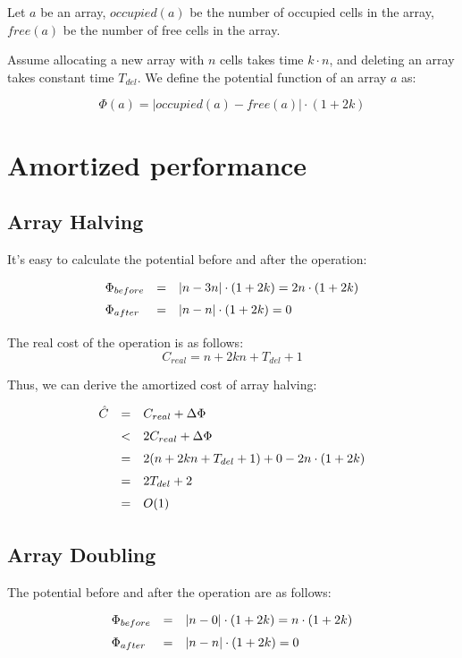 Let $a$ be an array, $occupied(a)$ be the number of occupied cells in the array, $free(a)$ be the number of free cells in the array.

Assume allocating a new array with $n$ cells takes time $k \cdot n$, and deleting an array takes constant time $T_{del}$. We define the potential function of an array $a$ as:

\begin{equation}
\Phi(a) = | occupied(a) - free(a) | \cdot (1 + 2k)
\end{equation}

\section{Amortized performance}

  \subsection{Array Halving}
  It's easy to calculate the potential before and after the operation:
  \[
  \def\arraystretch{1.5}
  \begin{array}{lcl}
    \Phi_{before} & = & | n - 3n | \cdot (1 + 2k) = 2n \cdot (1 + 2k) \\
    \Phi_{after} & = & | n - n | \cdot (1 + 2k) = 0
  \end{array}
  \]


  The real cost of the operation is as follows:
  \[
  C_{real} = n + 2kn + T_{del} + 1
  \]


  Thus, we can derive the amortized cost of array halving:
  \[
  \def\arraystretch{1.5}
  \begin{array}{lcl}
  \hat C & = & C_{real} + \Delta \Phi \\
         & < & 2 C_{real} + \Delta \Phi \\
         & = & 2(n + 2kn + T_{del} + 1) + 0 - 2n \cdot (1 + 2k) \\
         & = & 2T_{del} + 2 \\
         & = & O(1)
  \end{array}
  \]

  \subsection{Array Doubling}
  The potential before and after the operation are as follows:
  \[
  \def\arraystretch{1.5}
  \begin{array}{lcl}
    \Phi_{before} & = & | n - 0 | \cdot (1 + 2k) = n \cdot (1 + 2k) \\
    \Phi_{after} & = & | n - n | \cdot (1 + 2k) = 0
  \end{array}
  \]

